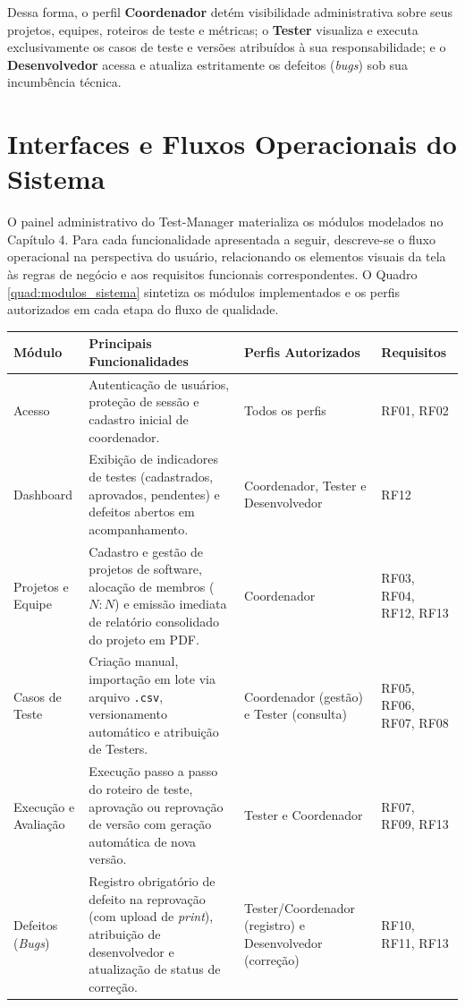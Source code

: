 Dessa forma, o perfil \textbf{Coordenador} detém visibilidade administrativa sobre seus projetos, equipes, roteiros de teste e métricas; o \textbf{Tester} visualiza e executa exclusivamente os casos de teste e versões atribuídos à sua responsabilidade; e o \textbf{Desenvolvedor} acessa e atualiza estritamente os defeitos (\textit{bugs}) sob sua incumbência técnica.

\section{Interfaces e Fluxos Operacionais do Sistema}

O painel administrativo do Test-Manager materializa os módulos modelados no Capítulo 4. Para cada funcionalidade apresentada a seguir, descreve-se o fluxo operacional na perspectiva do usuário, relacionando os elementos visuais da tela às regras de negócio e aos requisitos funcionais correspondentes. O Quadro \ref{quad:modulos_sistema} sintetiza os módulos implementados e os perfis autorizados em cada etapa do fluxo de qualidade.

\begin{quadro}[!htb]
\centering
\caption{Módulos do sistema Test-Manager, funcionalidades e perfis de acesso.}
\label{quad:modulos_sistema}
\small
\begin{tabularx}{\textwidth}{|p{2.5cm}|X|p{3.4cm}|p{2.2cm}|}
\hline
\textbf{Módulo} & \textbf{Principais Funcionalidades} & \textbf{Perfis Autorizados} & \textbf{Requisitos} \\ \hline
Acesso & Autenticação de usuários, proteção de sessão e cadastro inicial de coordenador. & Todos os perfis & RF01, RF02 \\ \hline
Dashboard & Exibição de indicadores de testes (cadastrados, aprovados, pendentes) e defeitos abertos em acompanhamento. & Coordenador, Tester e Desenvolvedor & RF12 \\ \hline
Projetos e Equipe & Cadastro e gestão de projetos de software, alocação de membros ($N:N$) e emissão imediata de relatório consolidado do projeto em PDF. & Coordenador & RF03, RF04, RF12, RF13 \\ \hline
Casos de Teste & Criação manual, importação em lote via arquivo \texttt{.csv}, versionamento automático e atribuição de Testers. & Coordenador (gestão) e Tester (consulta) & RF05, RF06, RF07, RF08 \\ \hline
Execução e Avaliação & Execução passo a passo do roteiro de teste, aprovação ou reprovação de versão com geração automática de nova versão. & Tester e Coordenador & RF07, RF09, RF13 \\ \hline
Defeitos (\textit{Bugs}) & Registro obrigatório de defeito na reprovação (com upload de \textit{print}), atribuição de desenvolvedor e atualização de status de correção. & Tester/Coordenador (registro) e Desenvolvedor (correção) & RF10, RF11, RF13 \\ \hline
\end{tabularx}
\end{quadro}

